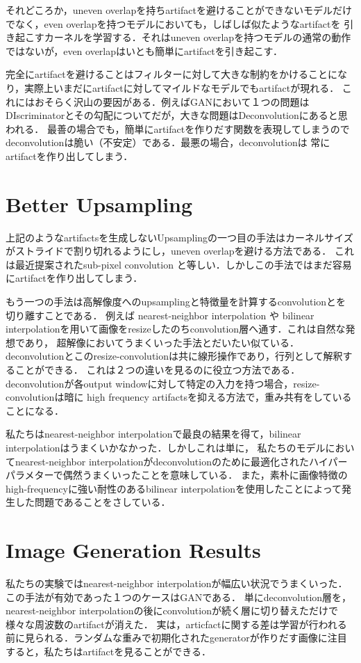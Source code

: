 \documentclass[uplatex, dvipdfmx]{jsarticle}
\theoremstyle{definition}
\begin{document}
    それどころか，uneven overlapを持ちartifactを避けることができないモデルだけでなく，even overlapを持つモデルにおいても，しばしば似たようなartifactを
    引き起こすカーネルを学習する．それはuneven overlapを持つモデルの通常の動作ではないが，even overlapはいとも簡単にartifactを引き起こす．

    完全にartifactを避けることはフィルターに対して大きな制約をかけることになり，実際上いまだにartifactに対してマイルドなモデルでもartifactが現れる．
    これにはおそらく沢山の要因がある．例えばGANにおいて１つの問題はDIscriminatorとその勾配についてだが，大きな問題はDeconvolutionにあると思われる．
    最善の場合でも，簡単にartifactを作りだす関数を表現してしまうのでdeconvolutionは脆い（不安定）である．最悪の場合，deconvolutionは
    常にartifactを作り出してしまう．

    \section{Better Upsampling}
    上記のようなartifactsを生成しないUpsamplingの一つ目の手法はカーネルサイズがストライドで割り切れるようにし，uneven overlapを避ける方法である．
    これは最近提案されたsub-pixel convolution \cite{shi}と等しい．しかしこの手法ではまだ容易にartifactを作り出してしまう．

    もう一つの手法は高解像度へのupsamplingと特徴量を計算するconvolutionとを切り離すことである．
    例えば nearest-neighbor interpolation や bilinear interpolationを用いて画像をresizeしたのちconvolution層へ通す．これは自然な発想であり，
    超解像においてうまくいった手法とだいたい似ている．deconvolutionとこのresize-convolutionは共に線形操作であり，行列として解釈することができる．
    これは２つの違いを見るのに役立つ方法である．deconvolutionが各output windowに対して特定の入力を持つ場合，resize-convolutionは暗に
    high frequency artifactsを抑える方法で，重み共有をしていることになる．

    私たちはnearest-neighbor interpolationで最良の結果を得て，bilinear interpolationはうまくいかなかった．しかしこれは単に，
    私たちのモデルにおいてnearest-neighbor interpolationがdeconvolutionのために最適化されたハイパーパラメターで偶然うまくいったことを意味している．
    また，素朴に画像特徴のhigh-frequencyに強い耐性のあるbilinear interpolationを使用したことによって発生した問題であることをさしている．

    \section{Image Generation Results}
    私たちの実験ではnearest-neighbor interpolationが幅広い状況でうまくいった．この手法が有効であった１つのケースはGANである．
    単にdeconvolution層を，nearest-neighbor interpolationの後にconvolutionが続く層に切り替えただけで様々な周波数のartifactが消えた．
    実は，articfactに関する差は学習が行われる前に見られる．ランダムな重みで初期化されたgeneratorが作りだす画像に注目すると，私たちはartifactを見ることができる．
\end{document}
